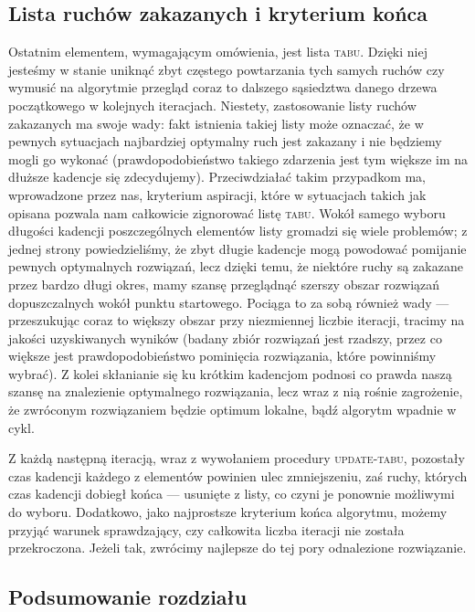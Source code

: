 \subsection{Lista ruchów zakazanych i kryterium końca}

Ostatnim elementem, wymagającym omówienia, jest lista \textsc{tabu}. Dzięki niej jesteśmy w stanie uniknąć zbyt częstego powtarzania tych samych ruchów czy wymusić na algorytmie przegląd coraz to dalszego sąsiedztwa danego drzewa początkowego w kolejnych iteracjach. Niestety, zastosowanie listy ruchów zakazanych ma swoje wady: fakt istnienia takiej listy może oznaczać, że w pewnych sytuacjach najbardziej optymalny ruch jest zakazany i nie będziemy mogli go wykonać (prawdopodobieństwo takiego zdarzenia jest tym większe im na dłuższe kadencje się zdecydujemy). Przeciwdziałać takim przypadkom ma, wprowadzone przez nas, kryterium aspiracji, które w sytuacjach takich jak opisana pozwala nam całkowicie zignorować listę \textsc{tabu}. Wokół samego wyboru długości kadencji poszczególnych elementów listy gromadzi się wiele problemów; z jednej strony powiedzieliśmy, że zbyt długie kadencje mogą powodować pomijanie pewnych optymalnych rozwiązań, lecz dzięki temu, że niektóre ruchy są zakazane przez bardzo długi okres, mamy szansę przeglądnąć szerszy obszar rozwiązań dopuszczalnych wokół punktu startowego. Pociąga to za sobą również wady --- przeszukując coraz to większy obszar przy niezmiennej liczbie iteracji, tracimy na jakości uzyskiwanych wyników (badany zbiór rozwiązań jest rzadszy, przez co większe jest prawdopodobieństwo pominięcia rozwiązania, które powinniśmy wybrać). Z kolei skłanianie się ku krótkim kadencjom podnosi co prawda naszą szansę na znalezienie optymalnego rozwiązania, lecz wraz z nią rośnie zagrożenie, że zwróconym rozwiązaniem będzie optimum lokalne, bądź algorytm wpadnie w cykl.

Z każdą następną iteracją, wraz z wywołaniem procedury \textsc{update-tabu}, pozostały czas kadencji każdego z elementów powinien ulec zmniejszeniu, zaś ruchy, których czas kadencji dobiegł końca --- usunięte z listy, co czyni je ponownie możliwymi do wyboru. Dodatkowo, jako najprostsze kryterium końca algorytmu, możemy przyjąć warunek sprawdzający, czy całkowita liczba iteracji nie została przekroczona. Jeżeli tak, zwrócimy najlepsze do tej pory odnalezione rozwiązanie.

\subsection{Podsumowanie rozdziału}

